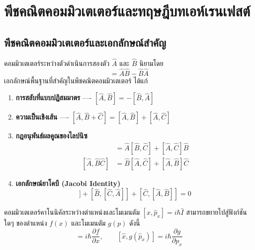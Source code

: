 \section{พีชคณิตคอมมิวเตเตอร์และทฤษฎีบทเอห์เรนเฟสต์}

\subsection{พีชคณิตคอมมิวเตเตอร์และเอกลักษณ์สำคัญ}
คอมมิวเตเตอร์ระหว่างตัวดำเนินการสองตัว $\hat{A}$ และ $\hat{B}$ นิยามโดย
\begin{equation}
[\hat{A}, \hat{B}] = \hat{A}\hat{B} - \hat{B}\hat{A}
\label{eq:commutator_def}
\end{equation}
เอกลักษณ์พื้นฐานที่สำคัญในพีชคณิตคอมมิวเตเตอร์ ได้แก่
\begin{enumerate}
    \item \textbf{การสลับที่แบบปฏิสมมาตร} ---- $[\hat{A}, \hat{B}] = -[\hat{B}, \hat{A}]$
    \item \textbf{ความเป็นเชิงเส้น} ---- $[\hat{A}, \hat{B} + \hat{C}] = [\hat{A}, \hat{B}] + [\hat{A}, \hat{C}]$
    \item \textbf{กฎอนุพันธ์ผลคูณของไลบ์นิซ}
    \begin{align}
    [\hat{A}\hat{B}, \hat{C}] &= \hat{A}[\hat{B}, \hat{C}] + [\hat{A}, \hat{C}]\hat{B} \\
    [\hat{A}, \hat{B}\hat{C}] &= \hat{B}[\hat{A}, \hat{C}] + [\hat{A}, \hat{B}]\hat{C}
    \end{align}
    \item \textbf{เอกลักษณ์ยาโคบี (Jacobi Identity)}
    \begin{equation}
    [\hat{A}, [\hat{B}, \hat{C}]] + [\hat{B}, [\hat{C}, \hat{A}]] + [\hat{C}, [\hat{A}, \hat{B}]] = 0
    \end{equation}
\end{enumerate}

คอมมิวเตเตอร์คาโนนิคัลระหว่างตำแหน่งและโมเมนตัม $[\hat{x}, \hat{p}_x] = i\hbar \hat{I}$ สามารถขยายไปสู่ฟังก์ชันใดๆ ของตำแหน่ง $f(x)$ และโมเมนตัม $g(p)$ ดังนี้
\begin{equation}
[f(\hat{x}), \hat{p}_x] = i\hbar \frac{\partial f}{\partial x}, \qquad [\hat{x}, g(\hat{p}_x)] = i\hbar \frac{\partial g}{\partial p_x}
\label{eq:functional_commutator}
\end{equation}

